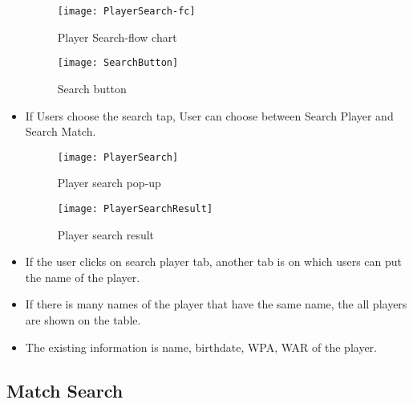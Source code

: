 \documentclass[conference,compsoc, twocolumn]{IEEEtran}
\begin{document}
\begin{itemize}
\begin{figure}[H]
\centering\texttt{[image: PlayerSearch-fc]}
\caption{Player Search-flow chart}
\end{figure}
\begin{figure}[H]
\centering\texttt{[image: SearchButton]}
\caption{Search button}
\end{figure}
\item If Users choose the search tap, User can choose between Search Player and Search Match.
\begin{figure}[H]
\centering\texttt{[image: PlayerSearch]}
\caption{Player search pop-up}
\end{figure}
\begin{figure}[H]
\centering\texttt{[image: PlayerSearchResult]}
\caption{Player search result}
\end{figure}
\item If the user clicks on search player tab, another tab is on which users can put the name of the player.
\item If there is many names of the player that have the same name, the all players are shown on the table.
\item The existing information is name, birthdate, WPA, WAR of the player.
\end {itemize}


\subsection{Match Search}
\end{document}
